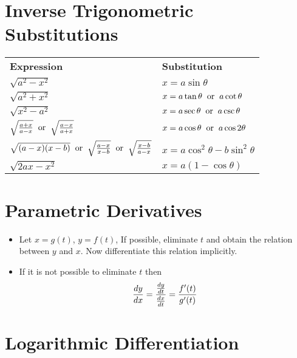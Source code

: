 \documentclass{article}
\begin{document}
\section{Inverse Trigonometric Substitutions}
\begin{center}
    \renewcommand{\arraystretch}{2}
    \begin{tabular}{l l}
        \textbf{Expression} & \textbf{Substitution} \\
        $\sqrt{a^2-x^2}$ & $x=a \sin \theta$\\
        $\sqrt{a^2+x^2}$ & $x=a \tan \theta \hspace{2mm} \text{or} \hspace{2mm}a \cot \theta$\\
        $\sqrt{x^2-a^2}$ & $x= a \sec \theta\hspace{2mm} \text{or} \hspace{2mm} a \csc \theta$\\
        $\sqrt{\frac{a+x}{a-x}}\hspace{2mm} \text{or} \hspace{2mm}\sqrt{\frac{a-x}{a+x}}$ & $x= a \cos \theta\hspace{2mm} \text{or}\hspace{2mm} a \cos 2 \theta$\\
        $\sqrt{(a-x)(x-b)}\hspace{2mm} \text{or} \hspace{2mm}\sqrt{\frac{a-x}{x-b}}\hspace{2mm} \text{or} \hspace{2mm}\sqrt{\frac{x-b}{a-x}}$ & $x= a \cos^2 \theta-b \sin^2 \theta$\\
        $\sqrt{2ax-x^2}$ & $x=a(1-\cos \theta)$
    \end{tabular}
\end{center}
\section{Parametric Derivatives}
\begin{itemize}
    \item Let $x=g(t)$, $y=f(t)$, If possible, eliminate $t$ and obtain the relation between $y$ and $x$. Now differentiate this relation implicitly.
    \item If it is not possible to eliminate $t$ then
    \\
    $$\dv{y}{x}=\frac{\dv{y}{t}}{\dv{x}{t}}=\frac{f'(t)}{g'(t)}$$
\end{itemize}
\section{Logarithmic Differentiation}
\end{document}
